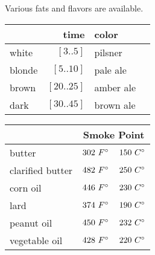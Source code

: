\begin{variation}

\item Various fats\cite{wikiOilSmokePoint} and flavors are available.
	\begin{center}
	\begin{tabular}{l r l l}
		       & time                 & color \\ \midrule
		white  & $[3..5]$     \minute & pilsner\\
		blonde & $[5..10]$    \minute & pale ale\\
		brown  & $[20..25]$   \minute & amber ale\\
		dark   & $[30..45]$   \minute & brown ale\\
	\end{tabular}
	\end{center}
	\begin{center}
	\begin{tabular}{l r r}
		&
		\multicolumn{2}{c}{Smoke Point}\\
		\midrule
		butter            & $302~F^\circ$ & $150~C^\circ$ \\
		clarified butter  & $482~F^\circ$ & $250~C^\circ$ \\
		corn oil          & $446~F^\circ$ & $230~C^\circ$ \\
		lard              & $374~F^\circ$ & $190~C^\circ$ \\
		peanut oil        & $450~F^\circ$ & $232~C^\circ$ \\
		vegetable oil     & $428~F^\circ$ & $220~C^\circ$
	\end{tabular}
	\end{center}
\end{variation}


\recipeend%
